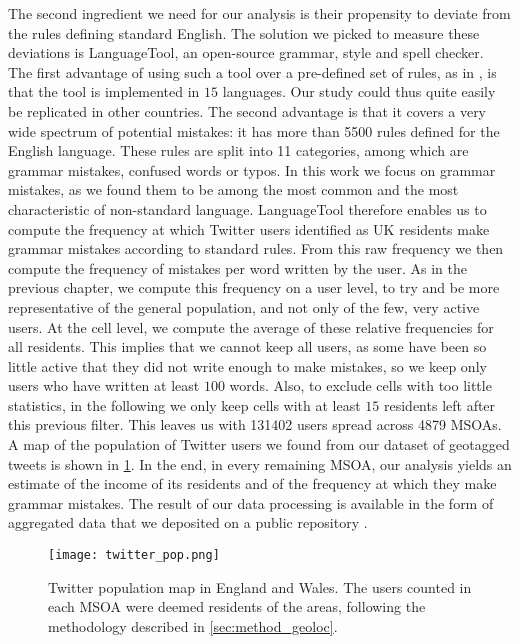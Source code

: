 \documentclass[../thesis.tex]{subfiles}
\begin{document}
The second ingredient we need for our analysis is their propensity to deviate from the
rules defining standard English. The solution we picked to measure these deviations is
LanguageTool, an open-source grammar, style and spell checker. The first advantage of
using such a tool over a pre-defined set of rules, as in
\cite{AbitbolSocioeconomicDependencies2018}, is that the tool is implemented in $15$
languages. Our study could thus quite easily be replicated in other countries. The
second advantage is that it covers a very wide spectrum of potential mistakes: it has
more than \SI{5500}{} rules defined for the English language. These rules are split into
11 categories, among which are grammar mistakes, confused words or typos. In this work
we focus on grammar mistakes, as we found them to be among the most common and the most
characteristic of non-standard language. LanguageTool therefore enables us to compute
the frequency at which Twitter users identified as UK residents make grammar mistakes
according to standard rules. From this raw frequency we then compute the frequency of
mistakes per word written by the user. As in the previous chapter, we compute this
frequency on a user level, to try and be more representative of the general population,
and not only of the few, very active users. At the cell level, we compute the average of
these relative frequencies for all residents. This implies that we cannot keep all
users, as some have been so little active that they did not write enough to make
mistakes, so we keep only users who have written at least $100$ words. Also, to exclude
cells with too little statistics, in the following we only keep cells with at least $15$
residents left after this previous filter. This leaves us with \SI{131402}{} users
spread across \SI{4879}{} \acp{MSOA}. A map of the population of Twitter users we found
from our dataset of geotagged tweets is shown in \cref{fig:EW_twitter_pop}. In the end,
in every remaining \ac{MSOA}, our analysis yields an estimate of the income of its
residents and of the frequency at which they make grammar mistakes. The result of our
data processing is available in the form of aggregated data that we deposited on a
public repository \cite{LoufFrequencyDetected2023}.
\begin{figure}
\centering
  \texttt{[image: twitter\_pop.png]}
  \caption{Twitter population map in England and Wales. The users counted in each
  \ac{MSOA} were deemed residents of the areas, following the methodology described in
  \cref{sec:method_geoloc}.}
  \label{fig:EW_twitter_pop}
\end{figure}
\end{document}
